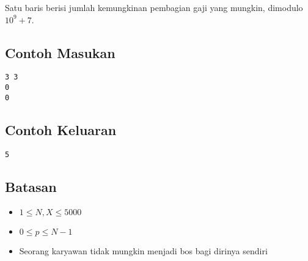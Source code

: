 \documentclass{article}
\begin{document}
\par\noindent Satu baris berisi jumlah kemungkinan pembagian gaji yang mungkin, dimodulo $10^9+7$.

\subsection*{Contoh Masukan}

\begin{lstlisting}
3 3
0
0
\end{lstlisting}

\subsection*{Contoh Keluaran}

\begin{lstlisting}
5
\end{lstlisting}

\subsection*{Batasan}

\begin{itemize}
  \item $1 \leq N, X \leq 5000$
  \item $0 \leq p \leq N-1$
  \item Seorang karyawan tidak mungkin menjadi bos bagi dirinya sendiri
\end{itemize}
\end{document}
